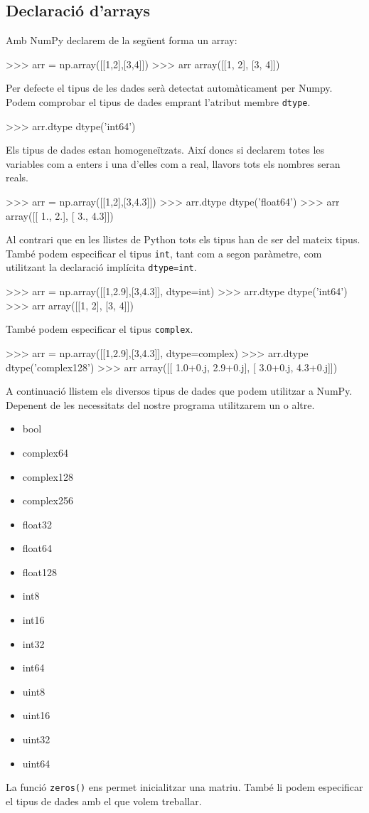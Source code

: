 \subsection{Declaració d'arrays}
Amb NumPy declarem de la següent forma un array:

\begin{tip}[caption=Iicialització d'array amb NumPy]
>>> arr = np.array([[1,2],[3,4]])
>>> arr
array([[1, 2],
       [3, 4]])
\end{tip}


Per defecte el tipus de les dades serà detectat automàticament per Numpy. Podem comprobar el tipus de dades emprant l'atribut membre {\tt dtype}.


\begin{blockcode}
>>> arr.dtype
dtype('int64')
\end{blockcode}

Els tipus de dades estan homogeneïtzats. Així doncs si declarem totes les variables com a enters i una d'elles com a real, llavors tots els nombres seran reals.

\begin{blockcode}
>>> arr = np.array([[1,2],[3,4.3]])
>>> arr.dtype
dtype('float64')
>>> arr
array([[ 1.,  2.],
       [ 3.,  4.3]])
\end{blockcode}
Al contrari que en les llistes de Python tots els tipus han de ser del mateix tipus. També podem especificar el tipus {\tt int}, tant com a segon paràmetre, com utilitzant la declaració implícita {\tt dtype=int}.
\begin{blockcode}
>>> arr = np.array([[1,2.9],[3,4.3]], dtype=int)
>>> arr.dtype
dtype('int64')
>>> arr
array([[1, 2],
       [3, 4]])
\end{blockcode}
També podem especificar el tipus {\tt complex}.
\begin{blockcode}
>>> arr = np.array([[1,2.9],[3,4.3]], dtype=complex)
>>> arr.dtype
dtype('complex128')
>>> arr
array([[ 1.0+0.j,  2.9+0.j],
       [ 3.0+0.j,  4.3+0.j]])
\end{blockcode}
A continuació llistem els diversos tipus de dades que podem utilitzar a NumPy. Depenent de les necessitats del nostre programa utilitzarem un o altre.
\begin{itemize}
\item bool
\item complex64
\item complex128
\item complex256
\item float32
\item float64
\item float128
\item int8
\item int16
\item int32
\item int64
\item uint8
\item uint16
\item uint32
\item uint64
\end{itemize}
La funció {\tt zeros()} ens permet inicialitzar una matriu. També li podem especificar el tipus de dades amb el que volem treballar.


